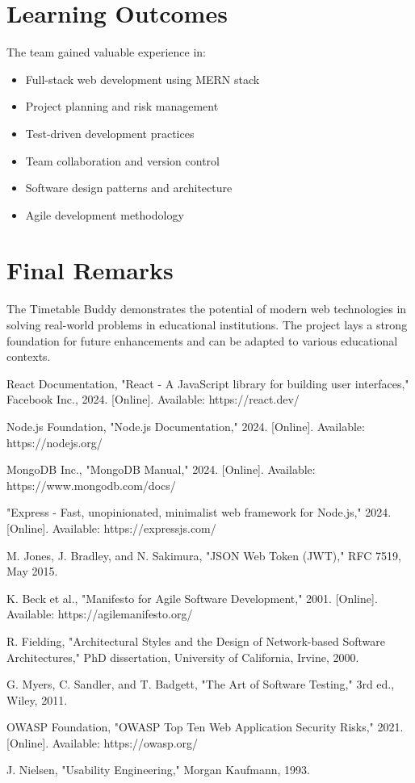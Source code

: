 \documentclass[12pt,a4paper]{report}
\begin{document}
\section{Learning Outcomes}
The team gained valuable experience in:
\begin{itemize}[leftmargin=*]
    \item Full-stack web development using MERN stack
    \item Project planning and risk management
    \item Test-driven development practices
    \item Team collaboration and version control
    \item Software design patterns and architecture
    \item Agile development methodology
\end{itemize}

\section{Final Remarks}
The Timetable Buddy demonstrates the potential of modern web technologies in solving real-world problems in educational institutions. The project lays a strong foundation for future enhancements and can be adapted to various educational contexts.

\begin{thebibliography}{99}

React Documentation, "React - A JavaScript library for building user interfaces," Facebook Inc., 2024. [Online]. Available: https://react.dev/

Node.js Foundation, "Node.js Documentation," 2024. [Online]. Available: https://nodejs.org/

MongoDB Inc., "MongoDB Manual," 2024. [Online]. Available: https://www.mongodb.com/docs/

"Express - Fast, unopinionated, minimalist web framework for Node.js," 2024. [Online]. Available: https://expressjs.com/

M. Jones, J. Bradley, and N. Sakimura, "JSON Web Token (JWT)," RFC 7519, May 2015.

K. Beck et al., "Manifesto for Agile Software Development," 2001. [Online]. Available: https://agilemanifesto.org/

R. Fielding, "Architectural Styles and the Design of Network-based Software Architectures," PhD dissertation, University of California, Irvine, 2000.

G. Myers, C. Sandler, and T. Badgett, "The Art of Software Testing," 3rd ed., Wiley, 2011.

OWASP Foundation, "OWASP Top Ten Web Application Security Risks," 2021. [Online]. Available: https://owasp.org/

J. Nielsen, "Usability Engineering," Morgan Kaufmann, 1993.

\end{thebibliography}
\end{document}
